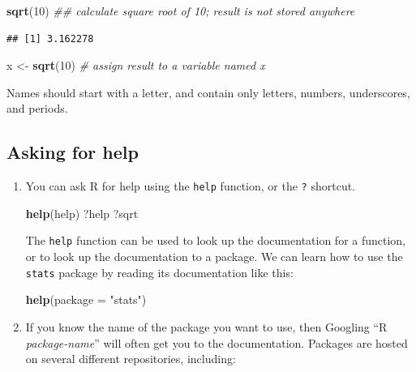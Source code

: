 \documentclass[]{book}
\newenvironment{Shaded}{\begin{snugshade}}{\end{snugshade}}
\newcommand{\CommentTok}[1]{\textcolor[rgb]{0.56,0.35,0.01}{\textit{#1}}}
\newcommand{\DataTypeTok}[1]{\textcolor[rgb]{0.13,0.29,0.53}{#1}}
\newcommand{\DecValTok}[1]{\textcolor[rgb]{0.00,0.00,0.81}{#1}}
\newcommand{\KeywordTok}[1]{\textcolor[rgb]{0.13,0.29,0.53}{\textbf{#1}}}
\newcommand{\NormalTok}[1]{#1}
\newcommand{\StringTok}[1]{\textcolor[rgb]{0.31,0.60,0.02}{#1}}
\begin{document}
\begin{Shaded}
\begin{Highlighting}[]
\KeywordTok{sqrt}\NormalTok{(}\DecValTok{10}\NormalTok{) }\CommentTok{## calculate square root of 10; result is not stored anywhere}
\end{Highlighting}
\end{Shaded}

\begin{verbatim}
## [1] 3.162278
\end{verbatim}

\begin{Shaded}
\begin{Highlighting}[]
\NormalTok{x <-}\StringTok{ }\KeywordTok{sqrt}\NormalTok{(}\DecValTok{10}\NormalTok{) }\CommentTok{# assign result to a variable named x}
\end{Highlighting}
\end{Shaded}

Names should start with a letter, and contain only letters, numbers, underscores, and periods.

\hypertarget{asking-for-help}{%
\subsection{Asking for help}\label{asking-for-help}}

\begin{enumerate}
\def\labelenumi{\arabic{enumi}.}
\item
  You can ask R for help using the \texttt{help} function, or the \texttt{?} shortcut.

\begin{Shaded}
\begin{Highlighting}[]
\KeywordTok{help}\NormalTok{(help)}
\NormalTok{?help}
\NormalTok{?sqrt}
\end{Highlighting}
\end{Shaded}

  The \texttt{help} function can be used to look up the documentation for a function, or
  to look up the documentation to a package. We can learn how to use the \texttt{stats}
  package by reading its documentation like this:

\begin{Shaded}
\begin{Highlighting}[]
   \KeywordTok{help}\NormalTok{(}\DataTypeTok{package =} \StringTok{"stats"}\NormalTok{)}
\end{Highlighting}
\end{Shaded}
\item
  If you know the name of the package you want to use, then Googling ``R \emph{package-name}'' will
  often get you to the documentation. Packages are hosted on several different repositories, including:
\end{enumerate}
\end{document}
